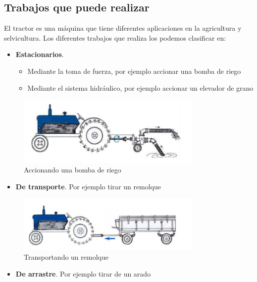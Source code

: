 \documentclass[a4paper,12pt,oneside]{article}
\begin{document}
\subsection{Trabajos que puede realizar}
\label{sec:orgcc706e9}
El tractor es una máquina que tiene diferentes aplicaciones en la agricultura y
selvicultura. Los diferentes trabajos que realiza los podemos clasificar en:
\begin{itemize}
\item \textbf{Estacionarios}.
\begin{itemize}
\item Mediante la toma de fuerza, por ejemplo accionar una bomba de riego
\item Mediante el sistema hidráulico, por ejemplo accionar un elevador de grano
\end{itemize}
\end{itemize}
\begin{center}
\begin{figure}[htbp]
\centering
\includegraphics[width=0.8\textwidth]{./img_0009/tractor_riego.PNG}
\caption{Accionando una bomba de riego}
\end{figure}
\end{center}
\begin{itemize}
\item \textbf{De transporte}. Por ejemplo tirar un remolque
\end{itemize}
\begin{center}
\begin{figure}[htbp]
\centering
\includegraphics[width=0.8\textwidth]{./img_0009/tractor_remolque.PNG}
\caption{Transportando un remolque}
\end{figure}
\end{center}
\begin{itemize}
\item \textbf{De arrastre}. Por ejemplo tirar de un arado
\end{itemize}
\end{document}
